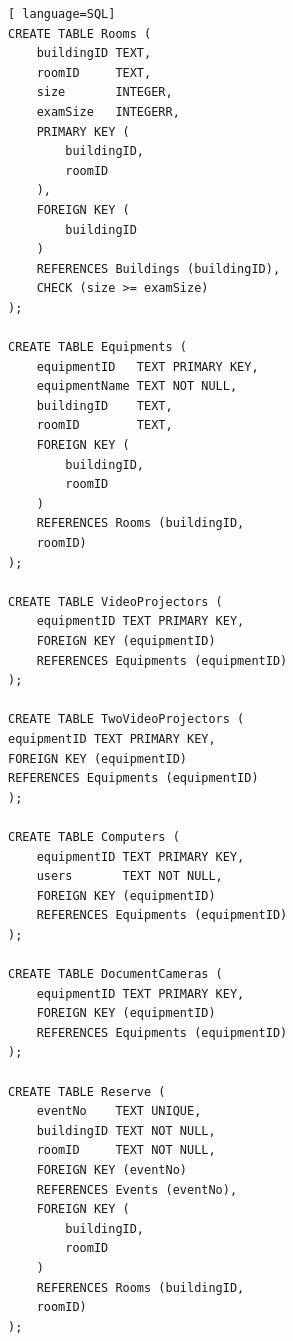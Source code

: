 \documentclass{article}
\begin{document}
\begin{lstlisting}[ language=SQL]
CREATE TABLE Rooms (
	buildingID TEXT,
	roomID     TEXT,
	size       INTEGER,
	examSize   INTEGERR,
	PRIMARY KEY (
		buildingID,
		roomID
	),
	FOREIGN KEY (
		buildingID
	)
	REFERENCES Buildings (buildingID),
	CHECK (size >= examSize) 
);

CREATE TABLE Equipments (
	equipmentID   TEXT PRIMARY KEY,
	equipmentName TEXT NOT NULL,
	buildingID    TEXT,
	roomID        TEXT,
	FOREIGN KEY (
		buildingID,
		roomID
	)
	REFERENCES Rooms (buildingID,
	roomID) 
);

CREATE TABLE VideoProjectors (
	equipmentID TEXT PRIMARY KEY,
	FOREIGN KEY (equipmentID)
	REFERENCES Equipments (equipmentID) 
);

CREATE TABLE TwoVideoProjectors (
equipmentID TEXT PRIMARY KEY,
FOREIGN KEY (equipmentID)
REFERENCES Equipments (equipmentID) 
);

CREATE TABLE Computers (
	equipmentID TEXT PRIMARY KEY,
	users       TEXT NOT NULL,
	FOREIGN KEY (equipmentID)
	REFERENCES Equipments (equipmentID) 
);

CREATE TABLE DocumentCameras (
	equipmentID TEXT PRIMARY KEY,
	FOREIGN KEY (equipmentID)
	REFERENCES Equipments (equipmentID) 
);

CREATE TABLE Reserve (
	eventNo    TEXT UNIQUE,
	buildingID TEXT NOT NULL,
	roomID     TEXT NOT NULL,
	FOREIGN KEY (eventNo)
	REFERENCES Events (eventNo),
	FOREIGN KEY (
		buildingID,
		roomID
	)
	REFERENCES Rooms (buildingID,
	roomID) 
);
\end{lstlisting}
\end{document}

